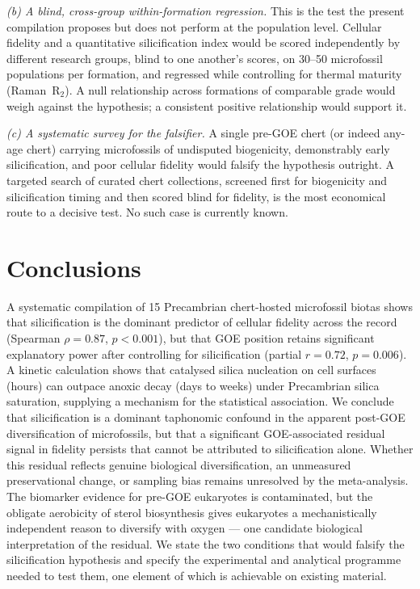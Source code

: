 \documentclass[11pt]{article}
\begin{document}
\textit{(b) A blind, cross-group within-formation regression.} This is the test the present
compilation proposes but does not perform at the population level. Cellular fidelity and a
quantitative silicification index would be scored independently by different research groups, blind
to one another's scores, on 30--50 microfossil populations per formation, and regressed while
controlling for thermal maturity (Raman~R$_2$). A null relationship across formations of comparable
grade would weigh against the hypothesis; a consistent positive relationship would support it.

\textit{(c) A systematic survey for the falsifier.} A single pre-GOE chert (or indeed any-age chert)
carrying microfossils of undisputed biogenicity, demonstrably early silicification, and poor cellular
fidelity would falsify the hypothesis outright. A targeted search of curated chert collections,
screened first for biogenicity and silicification timing and then scored blind for fidelity, is the
most economical route to a decisive test. No such case is currently known.

\section{Conclusions}

A systematic compilation of 15 Precambrian chert-hosted microfossil biotas shows that silicification
is the dominant predictor of cellular fidelity across the record (Spearman $\rho = 0.87$,
$p < 0.001$), but that GOE position retains significant explanatory power after controlling for
silicification (partial $r = 0.72$, $p = 0.006$). A kinetic calculation shows that catalysed silica
nucleation on cell surfaces (hours) can outpace anoxic decay (days to weeks) under Precambrian
silica saturation, supplying a mechanism for the statistical association. We conclude that
silicification is a dominant taphonomic confound in the apparent post-GOE diversification of
microfossils, but that a significant GOE-associated residual signal in fidelity persists that cannot
be attributed to silicification alone. Whether this residual reflects genuine biological
diversification, an unmeasured preservational change, or sampling bias remains unresolved by the
meta-analysis. The biomarker evidence for pre-GOE eukaryotes is contaminated, but the obligate
aerobicity of sterol biosynthesis gives eukaryotes a mechanistically independent reason to diversify
with oxygen --- one candidate biological interpretation of the residual. We state the two conditions
that would falsify the silicification hypothesis and specify the experimental and analytical
programme needed to test them, one element of which is achievable on existing material.
\end{document}

